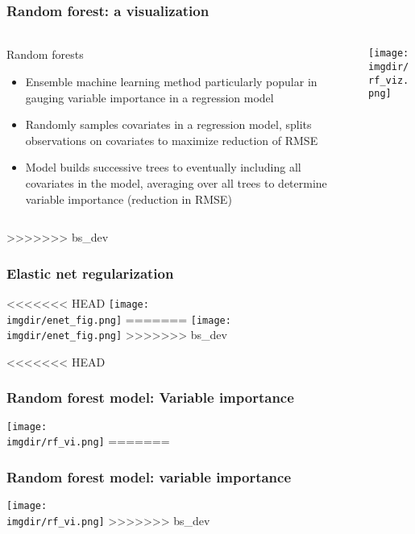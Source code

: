 \documentclass[aspectratio=169, t, 10pt]{beamer}
\begin{document}
\begin{frame}
  \frametitle{Random forest: a visualization}
  \framesubtitle{\citep{koehrsen_2018}}
  \begin{columns}[T]
    \begin{column}{.5\linewidth}
      \begin{block}{Random forests}
        \begin{itemize}
        \item Ensemble machine learning method particularly popular in
          gauging variable importance in a regression model
        \item Randomly samples covariates in a regression model, splits
          observations on covariates to maximize reduction of RMSE 
        \item Model builds successive trees to eventually including all
          covariates in the model, averaging over all trees to determine
          variable importance (reduction in RMSE)
        \end{itemize}
      \end{block}
    \end{column}
    \begin{column}{.5\linewidth}
      \texttt{[image: \\imgdir/rf\_viz.png]}
    \end{column}
  \end{columns}
\end{frame}
>>>>>>> bs_dev

\begin{frame}
  \frametitle{Elastic net regularization}
    \centering
<<<<<<< HEAD
        \texttt{[image: \\imgdir/enet\_fig.png]}
=======
        \texttt{[image: \\imgdir/enet\_fig.png]}
>>>>>>> bs_dev
 \end{frame}

\begin{frame}
<<<<<<< HEAD
  \frametitle{Random forest model: Variable importance}
    \centering
        \texttt{[image: \\imgdir/rf\_vi.png]}
=======
  \frametitle{Random forest model: variable importance}
    \centering
        \texttt{[image: \\imgdir/rf\_vi.png]}
>>>>>>> bs_dev
 \end{frame}
\end{document}
